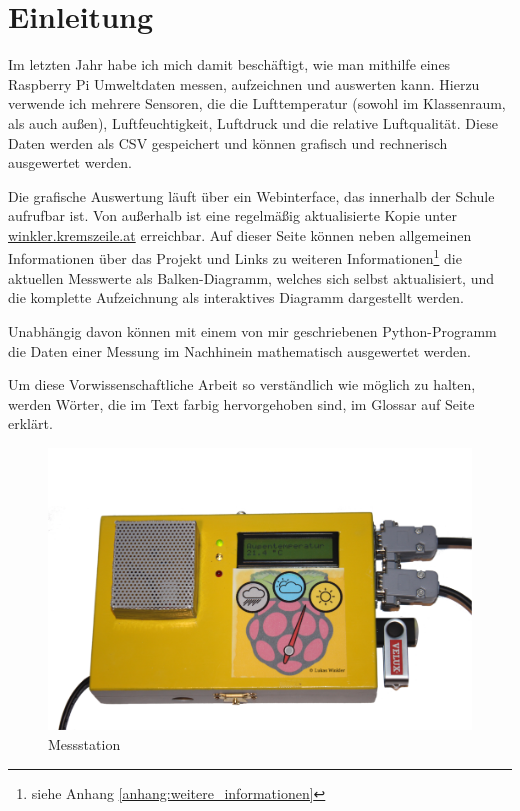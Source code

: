 \chapter{Einleitung}
Im letzten Jahr habe ich mich damit beschäftigt, wie man mithilfe eines Raspberry Pi Umweltdaten messen, aufzeichnen und auswerten kann. Hierzu verwende ich mehrere Sensoren, die die Lufttemperatur (sowohl im Klassenraum, als auch außen), Luftfeuchtigkeit, Luftdruck und die relative Luftqualität. Diese Daten werden als \gls{CSV} gespeichert und können grafisch und rechnerisch ausgewertet werden. 

Die grafische Auswertung läuft über ein Webinterface, das innerhalb der Schule aufrufbar ist. Von außerhalb ist eine regelmäßig aktualisierte Kopie unter \href{http://winkler.kremszeile.at/}{winkler.kremszeile.at} erreichbar. Auf dieser Seite können neben allgemeinen Informationen über das Projekt und Links zu weiteren Informationen\footnote{siehe Anhang \ref{anhang:weitere_informationen}} die aktuellen Messwerte als Balken-Diagramm, welches sich selbst aktualisiert, und die komplette Aufzeichnung als interaktives Diagramm dargestellt werden.

Unabhängig davon können mit einem von mir geschriebenen \gls{Python}-Programm die Daten einer Messung im Nachhinein mathematisch ausgewertet werden.

Um diese Vorwissenschaftliche Arbeit so verständlich wie möglich zu halten, werden Wörter, die im Text farbig hervorgehoben sind, im Glossar auf Seite \pageref{main} erklärt.

\begin{figure}[h]
  \centering
     \includegraphics[width=\textwidth]{figures/gesamt.png}
  \caption{Messstation}
  \label{fig:gesamt}
\end{figure}